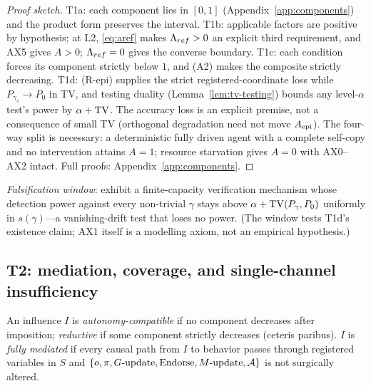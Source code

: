 \begin{proof}[Proof sketch]
T1a: each component lies in $[0,1]$ (Appendix~\ref{app:components}) and the
product form preserves the interval. T1b: applicable factors are positive by
hypothesis; at L2, \eqref{eq:aref} makes $\Lambda_{ref}>0$ an explicit third
requirement, and AX5 gives $A>0$; $\Lambda_{ref}=0$ gives the converse boundary.
T1c: each condition forces its component strictly below $1$, and (A2) makes the
composite strictly decreasing. T1d: (R-epi) supplies the strict
registered-coordinate loss while $P_{\gamma_s}\to P_0$ in TV, and testing
duality (Lemma~\ref{lem:tv-testing}) bounds any level-$\alpha$ test's power by
$\alpha+\mathrm{TV}$. The accuracy loss is an explicit premise, not a consequence of
small TV (orthogonal degradation need not move $A_{\mathrm{epi}}$). The four-way split is
necessary: a deterministic fully driven agent with a complete self-copy and no
intervention attains $A=1$; resource starvation gives $A=0$ with AX0--AX2
intact. Full proofs: Appendix~\ref{app:components}.
\end{proof}

\emph{Falsification window}: exhibit a finite-capacity verification mechanism
whose detection power against every non-trivial $\gamma$ stays above
$\alpha+\mathrm{TV}(P_\gamma,P_0)$ uniformly in $s(\gamma)$---a vanishing-drift test
that loses no power. (The window tests T1d's existence claim; AX1 itself is a
modelling axiom, not an empirical hypothesis.)

\subsection{T2: mediation, coverage, and single-channel insufficiency}
\label{sec:t2}

\begin{definition}\label{def:compat}
An influence $I$ is \emph{autonomy-compatible} if no component decreases after
imposition; \emph{reductive} if some component strictly decreases (ceteris
paribus). $I$ is \emph{fully mediated} if every causal path from $I$ to
behavior passes through registered variables in $S$ and
$\{o,\pi,G\text{-update},\mathrm{Endorse},M\text{-update},\mathcal{A}\}$ is not surgically
altered.
\end{definition}

